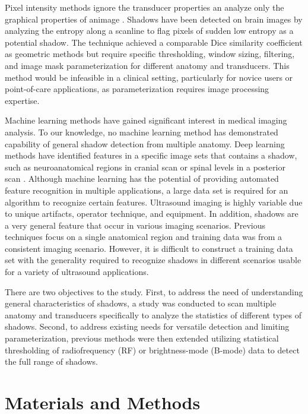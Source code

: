 \documentclass[preprint,5p,authoryear]{elsarticle}
\begin{document}
Pixel intensity methods ignore the transducer properties an analyze only the graphical properties of animage \citep{Hellier2010}. Shadows have been detected on brain images by analyzing the entropy along a scanline to flag pixels of sudden low entropy as a potential shadow. The technique achieved a comparable Dice similarity coefficient as geometric methods but require specific thresholding, window sizing, filtering, and image mask parameterization for different anatomy and transducers. This method would be infeasible in a clinical setting, particularly for novice users or point-of-care applications, as parameterization requires image processing expertise.

Machine learning methods have gained significant interest in medical imaging analysis. To our knowledge, no machine learning method has demonstrated capability of general shadow detection from multiple anatomy. Deep learning methods have identified features in a specific image sets that contains a shadow, such as neuroanatomical regions in cranial scan \citep{Milletari2017} or spinal levels in a posterior scan \citep{Hetherington2017}. Although machine learning has the potential of providing automated feature recognition in multiple applications, a large data set is required for an algorithm to recognize certain features. Ultrasound imaging is highly variable due to unique artifacts, operator technique, and equipment. In addition, shadows are a very general feature that occur in various imaging scenarios. Previous techniques focus on a single anatomical region and training data was from a consistent imaging scenario. However, it is difficult to construct a training data set with the generality required to recognize shadows in different scenarios usable for a variety of ultrasound applications.

There are two objectives to the study. First, to address the need of understanding general characteristics of shadows, a study was conducted to scan multiple anatomy and transducers specifically to analyze the statistics of different types of shadows. Second, to address existing needs for versatile detection and limiting parameterization, previous methods were then extended utilizing statistical thresholding of radiofrequency (RF) or brightness-mode (B-mode) data to detect the full range of shadows. 

\section*{Materials and Methods}
\label{MaM}
\end{document}
